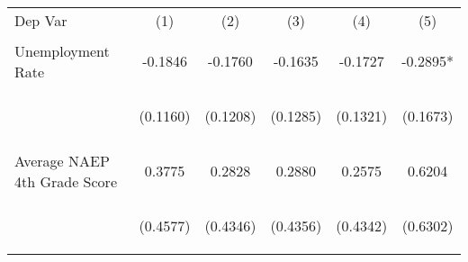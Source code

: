 \begin{center}
\begin{tabular}{lccccc}
\hline \noalign{\smallskip}Dep Var & (1) & (2) & (3) & (4) & (5)\\
\noalign{\smallskip}\hline \noalign{\smallskip}Unemployment Rate & \begin{scriptsize}-0.1846\end{scriptsize} & \begin{scriptsize}-0.1760\end{scriptsize} & \begin{scriptsize}-0.1635\end{scriptsize} & \begin{scriptsize}-0.1727\end{scriptsize} & \begin{scriptsize}-0.2895*\end{scriptsize}\\
 & \begin{scriptsize}(0.1160)\end{scriptsize} & \begin{scriptsize}(0.1208)\end{scriptsize} & \begin{scriptsize}(0.1285)\end{scriptsize} & \begin{scriptsize}(0.1321)\end{scriptsize} & \begin{scriptsize}(0.1673)\end{scriptsize}\\
\noalign{\smallskip}Average NAEP 4th Grade Score & \begin{scriptsize}0.3775\end{scriptsize} & \begin{scriptsize}0.2828\end{scriptsize} & \begin{scriptsize}0.2880\end{scriptsize} & \begin{scriptsize}0.2575\end{scriptsize} & \begin{scriptsize}0.6204\end{scriptsize}\\
 & \begin{scriptsize}(0.4577)\end{scriptsize} & \begin{scriptsize}(0.4346)\end{scriptsize} & \begin{scriptsize}(0.4356)\end{scriptsize} & \begin{scriptsize}(0.4342)\end{scriptsize} & \begin{scriptsize}(0.6302)\end{scriptsize}\\

\end{tabular}
\end{center}
